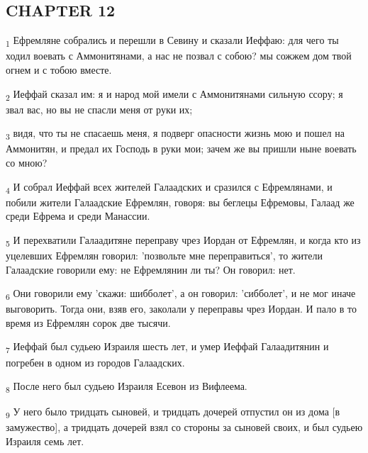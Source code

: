 \subsection{CHAPTER 12}
\begin{tcolorbox}
\textsubscript{1} Ефремляне собрались и перешли в Севину и сказали Иеффаю: для чего ты ходил воевать с Аммонитянами, а нас не позвал с собою? мы сожжем дом твой огнем и с тобою вместе.
\end{tcolorbox}
\begin{tcolorbox}
\textsubscript{2} Иеффай сказал им: я и народ мой имели с Аммонитянами сильную ссору; я звал вас, но вы не спасли меня от руки их;
\end{tcolorbox}
\begin{tcolorbox}
\textsubscript{3} видя, что ты не спасаешь меня, я подверг опасности жизнь мою и пошел на Аммонитян, и предал их Господь в руки мои; зачем же вы пришли ныне воевать со мною?
\end{tcolorbox}
\begin{tcolorbox}
\textsubscript{4} И собрал Иеффай всех жителей Галаадских и сразился с Ефремлянами, и побили жители Галаадские Ефремлян, говоря: вы беглецы Ефремовы, Галаад же среди Ефрема и среди Манассии.
\end{tcolorbox}
\begin{tcolorbox}
\textsubscript{5} И перехватили Галаадитяне переправу чрез Иордан от Ефремлян, и когда кто из уцелевших Ефремлян говорил: 'позвольте мне переправиться', то жители Галаадские говорили ему: не Ефремлянин ли ты? Он говорил: нет.
\end{tcolorbox}
\begin{tcolorbox}
\textsubscript{6} Они говорили ему 'скажи: шибболет', а он говорил: 'сибболет', и не мог иначе выговорить. Тогда они, взяв его, заколали у переправы чрез Иордан. И пало в то время из Ефремлян сорок две тысячи.
\end{tcolorbox}
\begin{tcolorbox}
\textsubscript{7} Иеффай был судьею Израиля шесть лет, и умер Иеффай Галаадитянин и погребен в одном из городов Галаадских.
\end{tcolorbox}
\begin{tcolorbox}
\textsubscript{8} После него был судьею Израиля Есевон из Вифлеема.
\end{tcolorbox}
\begin{tcolorbox}
\textsubscript{9} У него было тридцать сыновей, и тридцать дочерей отпустил он из дома [в замужество], а тридцать дочерей взял со стороны за сыновей своих, и был судьею Израиля семь лет.
\end{tcolorbox}
